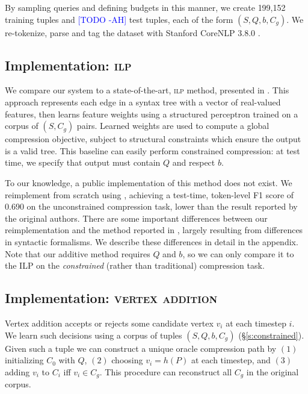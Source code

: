 \documentclass[11pt,a4paper]{article}
\newcommand{\ahcomment}[1]{\textcolor{blue}{[#1 -AH]}}
\begin{document}
By sampling queries and defining budgets in this manner, we create {199,152} training tuples and {\ahcomment{TODO}} test tuples, each of the form $(S,Q,b,C_g)$. We re-tokenize, parse and tag the dataset with Stanford CoreNLP 3.8.0 \cite{corenlp}.

\subsection{Implementation: \textsc{ilp}}\label{s:ilp}

We compare our system to a state-of-the-art, \textsc{ilp} method, presented in \citet{filippova2013overcoming}. This approach represents each edge in a syntax tree with a vector of real-valued features, then learns feature weights using a structured perceptron trained on a corpus of $(S,C_g)$ pairs. Learned weights are used to compute a global compression objective, subject to structural constraints which ensure the output is a valid tree. This baseline can easily perform constrained compression: at test time, we specify that output must contain $Q$ and respect $b$.

To our knowledge, a public implementation of this method does not exist. We reimplement from scratch using \citet{gurobi}, achieving a test-time, token-level F1 score of  0.690 on the unconstrained compression task, lower than the result reported by the original authors. There are some important differences between our reimplementation and the method reported in \citet{filippova2013overcoming}, largely resulting from differences in syntactic formalisms. We describe these differences in detail in the appendix. Note that our additive method requires $Q$ and $b$, so we can only compare it to the ILP on the \textit{constrained} (rather than traditional) compression task.

\subsection{Implementation: \textsc{vertex addition}}\label{s:transition}

Vertex addition accepts or rejects some candidate vertex $v_i$ at each timestep $i$. 
We learn such decisions using a corpus of tuples $(S,Q,b,C_g)$ (\S\ref{s:constrained}). Given such a tuple we can construct a unique oracle compression path by $(1)$ initializing $C_0$ with $Q$, $(2)$ choosing $v_i = h(P)$ at each timestep, and $(3)$ adding $v_i$ to $C_i$ iff $v_i \in C_g$. This procedure can reconstruct all $C_g$ in the original \citet{filippova2013overcoming} corpus. 
\end{document}

